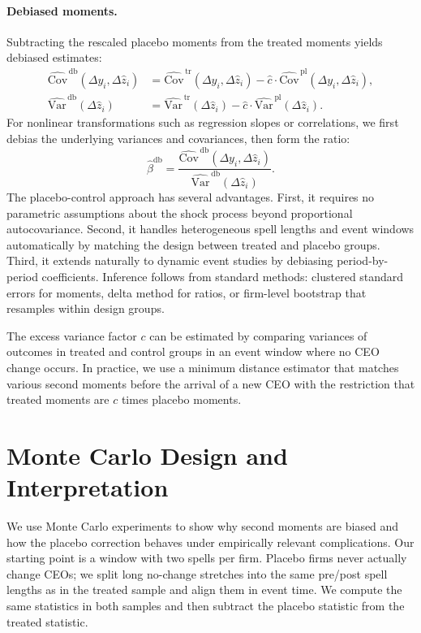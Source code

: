 \documentclass[11pt,a4paper]{article}
\newcommand{\Var}{\text{Var}}
\newcommand{\Cov}{\text{Cov}}
\begin{document}
\paragraph{Debiased moments.} Subtracting the rescaled placebo moments from the treated moments yields debiased estimates:
\begin{align}
\widehat{\Cov}^{\,\text{db}}(\Delta y_i,\Delta \hat z_i) &= \widehat{\Cov}^{\,\text{tr}}(\Delta y_i,\Delta \hat z_i) - \hat c\cdot\widehat{\Cov}^{\,\text{pl}}(\Delta y_i,\Delta \hat z_i),\\
\widehat{\Var}^{\,\text{db}}(\Delta \hat z_i) &= \widehat{\Var}^{\,\text{tr}}(\Delta \hat z_i) - \hat c\cdot\widehat{\Var}^{\,\text{pl}}(\Delta \hat z_i).
\end{align}
For nonlinear transformations such as regression slopes or correlations, we first debias the underlying variances and covariances, then form the ratio:
\begin{equation}
\hat\beta^{\text{db}} = \frac{\widehat{\Cov}^{\,\text{db}}(\Delta y_i,\Delta \hat z_i)}{\widehat{\Var}^{\,\text{db}}(\Delta \hat z_i)}.
\end{equation}
The placebo-control approach has several advantages. First, it requires no parametric assumptions about the shock process beyond proportional autocovariance. Second, it handles heterogeneous spell lengths and event windows automatically by matching the design between treated and placebo groups. Third, it extends naturally to dynamic event studies by debiasing period-by-period coefficients. Inference follows from standard methods: clustered standard errors for moments, delta method for ratios, or firm-level bootstrap that resamples within design groups.

The excess variance factor $c$ can be estimated by comparing variances of outcomes in treated and control groups in an event window where no CEO change occurs. In practice, we use a minimum distance estimator that matches various second moments before the arrival of a new CEO with the restriction that treated moments are $c$ times placebo moments. 

\section{Monte Carlo Design and Interpretation}

We use Monte Carlo experiments to show why second moments are biased and how the placebo correction behaves under empirically relevant complications. Our starting point is a window with two spells per firm. Placebo firms never actually change CEOs; we split long no-change stretches into the same pre/post spell lengths as in the treated sample and align them in event time. We compute the same statistics in both samples and then subtract the placebo statistic from the treated statistic.
\end{document}
